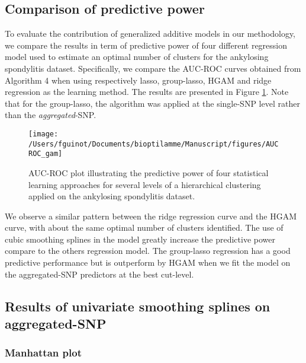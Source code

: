 \documentclass[]{book}
\begin{document}
\hypertarget{comparison-of-predictive-power}{%
\subsection{Comparison of predictive power}\label{comparison-of-predictive-power}}

To evaluate the contribution of generalized additive models in our
methodology, we compare the results in term of predictive power of four
different regression model used to estimate an optimal number of
clusters for the ankylosing spondylitis dataset. Specifically, we
compare the AUC-ROC curves obtained from Algorithm 4
when using respectively lasso, group-lasso, HGAM and ridge regression as
the learning method. The results are presented in Figure
\ref{fig:AUCgam}. Note that for the group-lasso, the algorithm was
applied at the single-SNP level rather than the \emph{aggregated}-SNP.



\begin{figure}

{\centering \texttt{[image: /Users/fguinot/Documents/bioptilamme/Manuscript/figures/AUCROC\_gam]} 

}

\caption{AUC-ROC plot illustrating the predictive power of four statistical learning approaches for several levels of a hierarchical clustering applied on the ankylosing spondylitis dataset.}\label{fig:AUCgam}
\end{figure}

We observe a similar pattern between the ridge regression curve and the
HGAM curve, with about the same optimal number of clusters identified.
The use of cubic smoothing splines in the model greatly increase the
predictive power compare to the others regression model. The group-lasso
regression has a good predictive performance but is outperform by HGAM
when we fit the model on the aggregated-SNP predictors at the best
cut-level.

\hypertarget{results-of-univariate-smoothing-splines-on-aggregated-snp}{%
\subsection{Results of univariate smoothing splines on aggregated-SNP}\label{results-of-univariate-smoothing-splines-on-aggregated-snp}}

\hypertarget{manhattan-plot}{%
\subsubsection{Manhattan plot}\label{manhattan-plot}}
\end{document}
